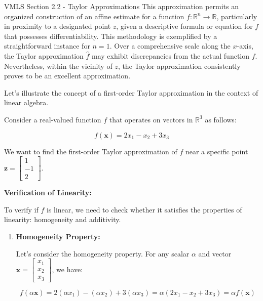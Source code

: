 \begin{notes}{VMLS Section 2.2 - Taylor Approximations}
    This approximation permits an organized construction of an affine estimate for a function $f : \mathbb{R}^n \to \mathbb{R}$, particularly in proximity to a designated point $z$, given a descriptive formula or equation for $f$ that possesses 
    differentiability. This methodology is exemplified by a straightforward instance for $n = 1$. Over a comprehensive scale along the $x$-axis, the Taylor approximation $\hat{f}$ may exhibit discrepancies from the actual function $f$. Nevertheless, 
    within the vicinity of $z$, the Taylor approximation consistently proves to be an excellent approximation.
    
    \begin{Highlight}
        Let's illustrate the concept of a first-order Taylor approximation in the context of linear algebra.
        
        
        Consider a real-valued function \(f\) that operates on vectors in \(\mathbb{R}^3\) as follows:
        
        \[f(\mathbf{x}) = 2x_1 - x_2 + 3x_3\]
        
        We want to find the first-order Taylor approximation of \(f\) near a specific point \(\mathbf{z} = \begin{bmatrix} 1 \\ -1 \\ 2 \end{bmatrix}\).
        
        \textbf{Verification of Linearity:} \vspace*{1em}
        
        To verify if \(f\) is linear, we need to check whether it satisfies the properties of linearity: homogeneity and additivity.
        
        \begin{enumerate}
            \item \textbf{Homogeneity Property:}
            
            Let's consider the homogeneity property. For any scalar \(\alpha\) and vector \(\mathbf{x} = \begin{bmatrix} x_1 \\ x_2 \\ x_3 \end{bmatrix}\), we have:
            
            \[f(\alpha\mathbf{x}) = 2(\alpha x_1) - (\alpha x_2) + 3(\alpha x_3) = \alpha(2x_1 - x_2 + 3x_3) = \alpha f(\mathbf{x})\]
            

\end{enumerate}
\end{Highlight}
\end{notes}
